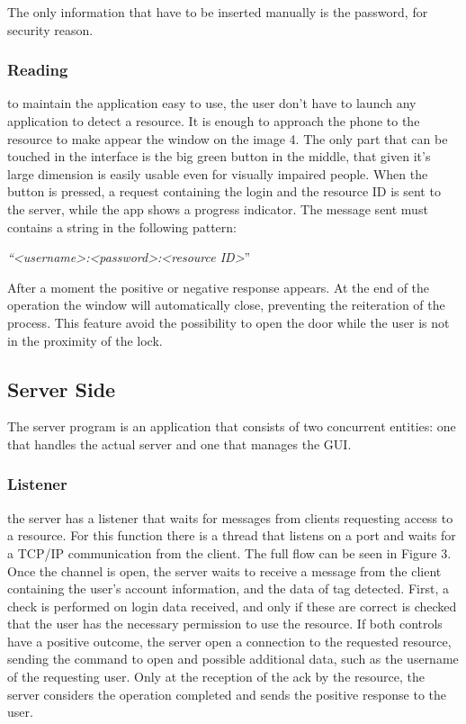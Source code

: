 \documentclass[conference]{IEEEtran}
\begin{document}
 The only information that have to be inserted manually is the password, for security reason.

\subsubsection{Reading}

to maintain the application easy to use, the user don’t have to launch any application to detect a resource. It is enough to approach the phone to the resource to make appear the window on the image 4. The only part that can be touched in the interface is the big green button in the middle, that given it’s large dimension is easily usable even for visually impaired people. When the button is pressed, a request containing the login and the resource ID is sent to the server, while the app shows a progress indicator. The message sent must contains a string in the following pattern:
\begin{center}
\textit{``\textless username\textgreater :\textless password\textgreater :\textless resource ID\textgreater}''
\end{center}
 After a moment the positive or negative response appears. At the end of the operation the window will automatically close, preventing the reiteration of the process. This feature avoid the possibility to open the door while the user is not in the proximity of the lock.

\subsection{Server Side}

The server program is an application that consists of two concurrent entities: one that handles the actual server and one that manages the GUI.

\subsubsection{Listener}

\label{serverCheck}
the server has a listener that waits for messages from clients requesting access to a resource. For this function there is a thread that listens on a port and waits for a TCP/IP communication from the client. The full flow can be seen in Figure 3.
Once the channel is open, the server waits to receive a message from the client containing the user's account information, and the data of tag detected. First, a check is performed on login data received, and only if these are correct is checked that the user has the necessary permission to use the resource. If both controls have a positive outcome, the server open a connection to the requested resource, sending the command to open and possible additional data, such as the username of the requesting user. Only at the reception of the ack by the resource, the server considers the operation completed and sends the positive response to the user.
\end{document}
